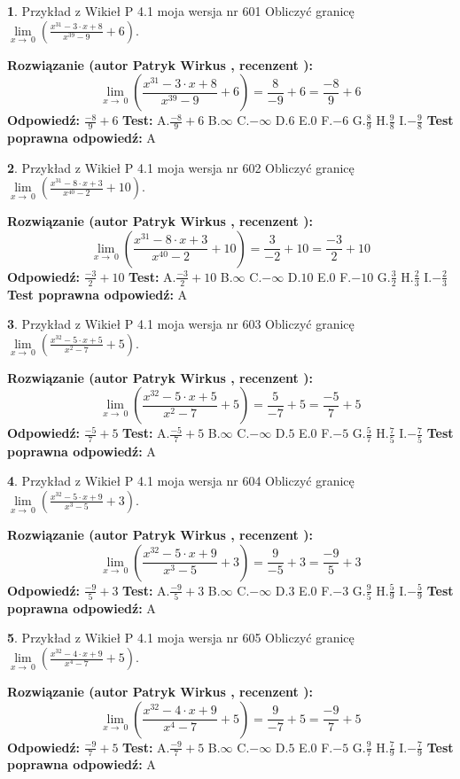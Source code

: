 \documentclass[12pt, a4paper]{article}
\theoremstyle{definition} %
\newtheorem{zad}{}
\newcommand{\zadStart}[1]{\begin{zad}#1\newline}
\newcommand{\zadStop}{\end{zad}}
\newcommand{\rozwStart}[2]{\noindent \textbf{Rozwiązanie (autor #1 , recenzent #2): }\newline}
\newcommand{\rozwStop}{\newline}
\newcommand{\odpStart}{\noindent \textbf{Odpowiedź:}\newline}
\newcommand{\odpStop}{\newline}
\newcommand{\testStart}{\noindent \textbf{Test:}\newline}
\newcommand{\testStop}{\newline}
\newcommand{\kluczStart}{\noindent \textbf{Test poprawna odpowiedź:}\newline}
\newcommand{\kluczStop}{\newline}
\begin{document}
\zadStart{Przykład z Wikieł P 4.1 moja wersja nr 601}
Obliczyć granicę $\lim\limits_{x\to\ 0}(\frac{x^{31}-3 \cdot x +8}{x^{39}-9}+6)$.
\zadStop
\rozwStart{Patryk Wirkus}{}
$$\lim\limits_{x\to\ 0}(\frac{x^{31}-3 \cdot x +8}{x^{39}-9}+6)=\frac{8}{-9}+6=\frac{-8}{9}+6$$
\rozwStop
\odpStart
$\frac{-8}{9}+6$
\odpStop
\testStart
A.$\frac{-8}{9}+6$
B.$\infty$
C.$-\infty$
D.$6$
E.$0$
F.$-6$
G.$\frac{8}{9}$
H.$\frac{9}{8}$
I.$-\frac{9}{8}$
\testStop
\kluczStart
A
\kluczStop



\zadStart{Przykład z Wikieł P 4.1 moja wersja nr 602}
Obliczyć granicę $\lim\limits_{x\to\ 0}(\frac{x^{31}-8 \cdot x +3}{x^{40}-2}+10)$.
\zadStop
\rozwStart{Patryk Wirkus}{}
$$\lim\limits_{x\to\ 0}(\frac{x^{31}-8 \cdot x +3}{x^{40}-2}+10)=\frac{3}{-2}+10=\frac{-3}{2}+10$$
\rozwStop
\odpStart
$\frac{-3}{2}+10$
\odpStop
\testStart
A.$\frac{-3}{2}+10$
B.$\infty$
C.$-\infty$
D.$10$
E.$0$
F.$-10$
G.$\frac{3}{2}$
H.$\frac{2}{3}$
I.$-\frac{2}{3}$
\testStop
\kluczStart
A
\kluczStop



\zadStart{Przykład z Wikieł P 4.1 moja wersja nr 603}
Obliczyć granicę $\lim\limits_{x\to\ 0}(\frac{x^{32}-5 \cdot x +5}{x^{2}-7}+5)$.
\zadStop
\rozwStart{Patryk Wirkus}{}
$$\lim\limits_{x\to\ 0}(\frac{x^{32}-5 \cdot x +5}{x^{2}-7}+5)=\frac{5}{-7}+5=\frac{-5}{7}+5$$
\rozwStop
\odpStart
$\frac{-5}{7}+5$
\odpStop
\testStart
A.$\frac{-5}{7}+5$
B.$\infty$
C.$-\infty$
D.$5$
E.$0$
F.$-5$
G.$\frac{5}{7}$
H.$\frac{7}{5}$
I.$-\frac{7}{5}$
\testStop
\kluczStart
A
\kluczStop



\zadStart{Przykład z Wikieł P 4.1 moja wersja nr 604}
Obliczyć granicę $\lim\limits_{x\to\ 0}(\frac{x^{32}-5 \cdot x +9}{x^{3}-5}+3)$.
\zadStop
\rozwStart{Patryk Wirkus}{}
$$\lim\limits_{x\to\ 0}(\frac{x^{32}-5 \cdot x +9}{x^{3}-5}+3)=\frac{9}{-5}+3=\frac{-9}{5}+3$$
\rozwStop
\odpStart
$\frac{-9}{5}+3$
\odpStop
\testStart
A.$\frac{-9}{5}+3$
B.$\infty$
C.$-\infty$
D.$3$
E.$0$
F.$-3$
G.$\frac{9}{5}$
H.$\frac{5}{9}$
I.$-\frac{5}{9}$
\testStop
\kluczStart
A
\kluczStop



\zadStart{Przykład z Wikieł P 4.1 moja wersja nr 605}
Obliczyć granicę $\lim\limits_{x\to\ 0}(\frac{x^{32}-4 \cdot x +9}{x^{4}-7}+5)$.
\zadStop
\rozwStart{Patryk Wirkus}{}
$$\lim\limits_{x\to\ 0}(\frac{x^{32}-4 \cdot x +9}{x^{4}-7}+5)=\frac{9}{-7}+5=\frac{-9}{7}+5$$
\rozwStop
\odpStart
$\frac{-9}{7}+5$
\odpStop
\testStart
A.$\frac{-9}{7}+5$
B.$\infty$
C.$-\infty$
D.$5$
E.$0$
F.$-5$
G.$\frac{9}{7}$
H.$\frac{7}{9}$
I.$-\frac{7}{9}$
\testStop
\kluczStart
A
\kluczStop
\end{document}
